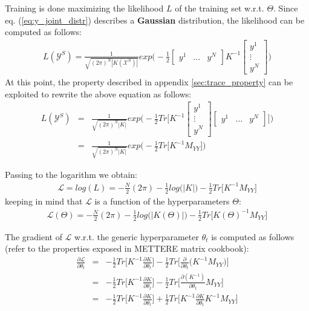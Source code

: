 \documentclass{article}
\begin{document}
Training is done maximizing the likelihood $L$ of the training set w.r.t. $\Theta$.
Since eq. (\ref{eq:y_joint_distr}) describes a \textbf{Gaussian} distribution, the likelihood can be computed as follows:
\begin{eqnarray}
L(\mathcal{Y}^S) = 
\frac{1}{\sqrt{(2 \pi)^N \left | K(\mathcal{X}^S) \right | }}
exp \bigg ( - \frac{1}{2}
\begin{bmatrix} y^1 & \hdots & y^N \end{bmatrix} 
K^{-1}
\begin{bmatrix} y^1 \\ \vdots \\ y^N \end{bmatrix} 
\bigg ) 
\end{eqnarray}
At this point, the property described in appendix \ref{sec:trace_property} can be exploited to rewrite the above equation as follows:
\begin{eqnarray}
L(\mathcal{Y}^S) &=& 
\frac{1}{\sqrt{(2 \pi)^N \left | K \right | }}
exp \bigg ( - \frac{1}{2}
Tr \bigg [ 
K^{-1}
\begin{bmatrix} y^1 \\ \vdots \\ y^N \end{bmatrix} 
\begin{bmatrix} y^1 & \hdots & y^N \end{bmatrix} 
\bigg ]
\bigg ) \\
&=&
\frac{1}{\sqrt{(2 \pi)^N \left | K \right | }}
exp \bigg ( - \frac{1}{2}
Tr \bigg [ 
K^{-1}
M_{YY}
\bigg ]
\bigg )
\end{eqnarray}

Passing to the logarithm we obtain:
\begin{eqnarray}
\mathcal{L} = log(L) = 
-\frac{N}{2}(2 \pi) 
-\frac{1}{2} log \big (\left | K \right | \big )
-\frac{1}{2} Tr \bigg [
K^{-1} M_{YY}
\bigg ] 
\end{eqnarray}
keeping in mind that $\mathcal{L}$ is a function of the hyperparameters $\Theta$:
\begin{eqnarray}
\mathcal{L}(\Theta) = 
-\frac{N}{2}(2 \pi) 
-\frac{1}{2} log \big (\left | K(\Theta) \right | \big )
-\frac{1}{2} Tr \bigg [
K(\Theta)^{-1} M_{YY}
\bigg ] 
\end{eqnarray}

The gradient of $\mathcal{L}$ w.r.t. the generic hyperparameter $\theta_t$ is computed as follows (refer to the properties exposed in METTERE matrix cookbook):
\begin{eqnarray}
\frac{\partial \mathcal{L}}{\partial \theta_t} &=& 
-\frac{1}{2} Tr \bigg [ K^{-1} \frac{\partial K}{\partial \theta_t} \bigg ]
-\frac{1}{2} Tr \bigg [ \frac{\partial }{\partial \theta_t} \big (  
K^{-1} M_{YY}
\big ) \bigg ] \\
&=& -\frac{1}{2} Tr \bigg [ K^{-1} \frac{\partial K}{\partial \theta_t} \bigg ]
-\frac{1}{2} Tr \bigg [ \frac{\partial (K^{-1}) }{\partial \theta_t} M_{YY} \bigg ] \\
&=& -\frac{1}{2} Tr \bigg [ K^{-1} \frac{\partial K}{\partial \theta_t} \bigg ]
+\frac{1}{2} Tr \bigg [ K^{-1} \frac{\partial K}{\partial \theta_t} K^{-1} M_{YY} \bigg ]
 \label{eq:L_grad}
\end{eqnarray}
\end{document}
